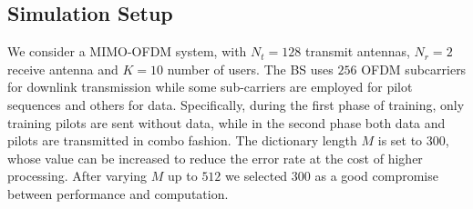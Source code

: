 \subsection{Simulation Setup}
We consider a MIMO-OFDM system, with $N_t=128$ transmit antennas, $N_r=2$ receive antenna and $K=10$ number of users. The BS uses $256$ OFDM subcarriers for downlink transmission while some sub-carriers are employed for pilot sequences and others for data. Specifically, during the first phase of training, only training pilots are sent without data, while in the second phase both data and pilots are transmitted in combo fashion. The dictionary length $M$ is set to $300$, whose value can be increased to reduce the error rate at the cost of higher processing. After varying $M$ up to $512$ we selected $300$ as a good compromise between performance and computation.
\begin{center}
\end{center}

